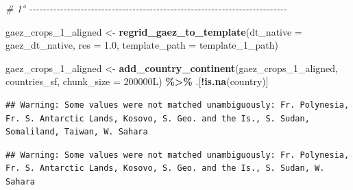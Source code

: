\documentclass[
  11pt,
]{article}
\newenvironment{Shaded}{\begin{snugshade}}{\end{snugshade}}
\newcommand{\AttributeTok}[1]{\textcolor[rgb]{0.13,0.29,0.53}{#1}}
\newcommand{\CommentTok}[1]{\textcolor[rgb]{0.56,0.35,0.01}{\textit{#1}}}
\newcommand{\DataTypeTok}[1]{\textcolor[rgb]{0.13,0.29,0.53}{#1}}
\newcommand{\DecValTok}[1]{\textcolor[rgb]{0.00,0.00,0.81}{#1}}
\newcommand{\FloatTok}[1]{\textcolor[rgb]{0.00,0.00,0.81}{#1}}
\newcommand{\FunctionTok}[1]{\textcolor[rgb]{0.13,0.29,0.53}{\textbf{#1}}}
\newcommand{\NormalTok}[1]{#1}
\newcommand{\OtherTok}[1]{\textcolor[rgb]{0.56,0.35,0.01}{#1}}
\newcommand{\SpecialCharTok}[1]{\textcolor[rgb]{0.81,0.36,0.00}{\textbf{#1}}}
\begin{document}
\begin{Shaded}
\begin{Highlighting}[]
\CommentTok{\# 1° {-}{-}{-}{-}{-}{-}{-}{-}{-}{-}{-}{-}{-}{-}{-}{-}{-}{-}{-}{-}{-}{-}{-}{-}{-}{-}{-}{-}{-}{-}{-}{-}{-}{-}{-}{-}{-}{-}{-}{-}{-}{-}{-}{-}{-}{-}{-}{-}{-}{-}{-}{-}{-}{-}{-}{-}{-}{-}{-}{-}{-}{-}{-}{-}{-}{-}{-}{-}{-}{-}{-}{-}{-}{-}{-}}

\NormalTok{gaez\_crops\_1\_aligned }\OtherTok{\textless{}{-}} \FunctionTok{regrid\_gaez\_to\_template}\NormalTok{(}\AttributeTok{dt\_native =}\NormalTok{ gaez\_dt\_native,}
                                                \AttributeTok{res =} \FloatTok{1.0}\NormalTok{,}
                                                \AttributeTok{template\_path =}\NormalTok{ template\_1\_path)}

\NormalTok{gaez\_crops\_1\_aligned }\OtherTok{\textless{}{-}} \FunctionTok{add\_country\_continent}\NormalTok{(gaez\_crops\_1\_aligned, countries\_sf,}
                                              \AttributeTok{chunk\_size =} \DecValTok{200000}\DataTypeTok{L}\NormalTok{) }\SpecialCharTok{\%\textgreater{}\%}
\NormalTok{  .[}\SpecialCharTok{!}\FunctionTok{is.na}\NormalTok{(country)]}
\end{Highlighting}
\end{Shaded}

\begin{verbatim}
## Warning: Some values were not matched unambiguously: Fr. Polynesia, Fr. S. Antarctic Lands, Kosovo, S. Geo. and the Is., S. Sudan, Somaliland, Taiwan, W. Sahara
\end{verbatim}

\begin{verbatim}
## Warning: Some values were not matched unambiguously: Fr. Polynesia, Fr. S. Antarctic Lands, Kosovo, S. Geo. and the Is., S. Sudan, W. Sahara
\end{verbatim}
\end{document}
